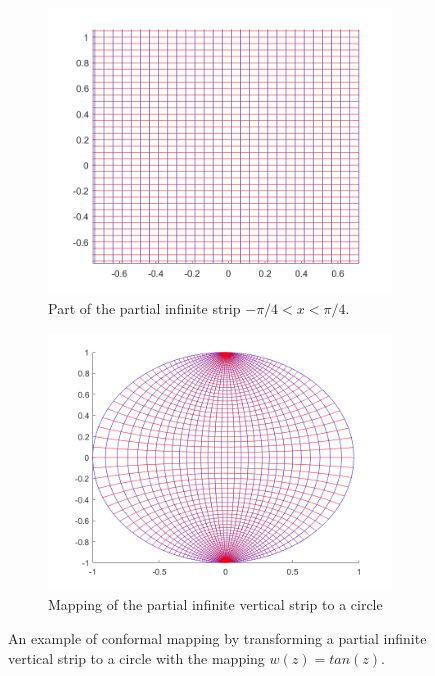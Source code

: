    \begin{figure}[h]
    \centering
    \begin{subfigure}[b]{0.45\textwidth}
        \centering
        \includegraphics[width=\textwidth]{images/tanMappingStrip.png}
        \caption{Part of the partial infinite strip $-\pi/4<x<\pi/4$.}
    \end{subfigure}
    \hfill
    \begin{subfigure}[b]{0.45\textwidth}
        \centering
        \includegraphics[width=\textwidth]{images/tanMapping.png}
        \caption{Mapping of the partial infinite vertical strip to a circle }
    \end{subfigure} 
    \caption[Conformal mapping of vertical strip to circle]{An example of conformal mapping by transforming a partial infinite vertical strip to a circle with the mapping $w(z) = tan(z)$.}
    \label{fig:circleMapping}
 \end{figure}
  
